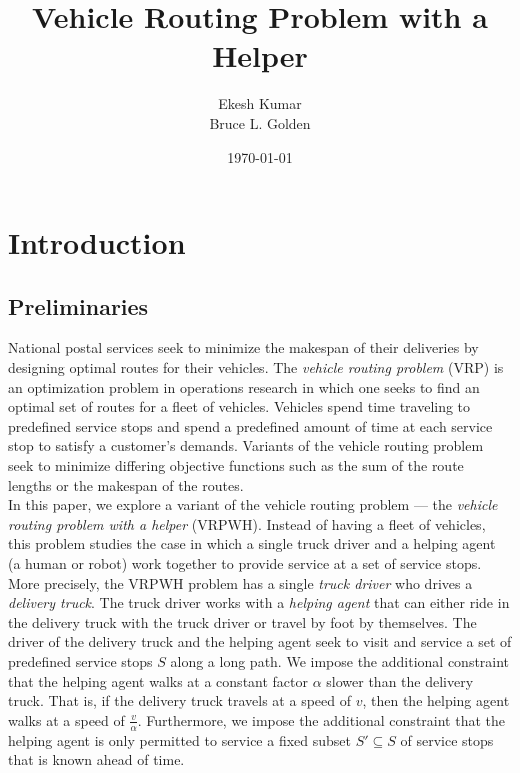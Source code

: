 \documentclass[12pt]{scrartcl}
\begin{document}
\doublespacing

\title{Vehicle Routing Problem with a Helper}
\author{Ekesh Kumar \\ Bruce L. Golden}
\date{\today}

\maketitle
\tableofcontents
\newpage

\section{Introduction}
\subsection{Preliminaries}
National postal services seek to minimize the makespan of their deliveries by designing optimal routes for their vehicles. The \textit{vehicle routing problem} (VRP) is an optimization problem in operations research in which one seeks to find an optimal set of routes for a fleet of vehicles. Vehicles spend time traveling to predefined service stops and spend a predefined amount of time at each service stop to satisfy a customer's demands. Variants of the vehicle routing problem seek to minimize differing objective functions such as the sum of the route lengths or the makespan of the routes. \\

In this paper, we explore a variant of the vehicle routing problem --- the \textit{vehicle routing problem with a helper} (VRPWH). Instead of having a fleet of vehicles, this problem studies the case in which a single truck driver and a helping agent (a human or robot) work together to provide service at a set of service stops. More precisely, the VRPWH problem has a single \textit{truck driver} who drives a \textit{delivery truck}. The truck driver works with a \textit{helping agent} that can either ride in the delivery truck with the truck driver or travel by foot by themselves. The driver of the delivery truck and the helping agent seek to visit and service a set of predefined service stops $S$ along a long path. We impose the additional constraint that the helping agent walks at a constant factor $\alpha$ slower than the delivery truck. That is, if the delivery truck travels at a speed of $v$, then the helping agent walks at a speed of $\frac{v}{\alpha}$. Furthermore, we impose the additional constraint that the helping agent is only permitted to service a fixed subset $S' \subseteq S$ of service stops that is known ahead of time. \\ %
\end{document}
